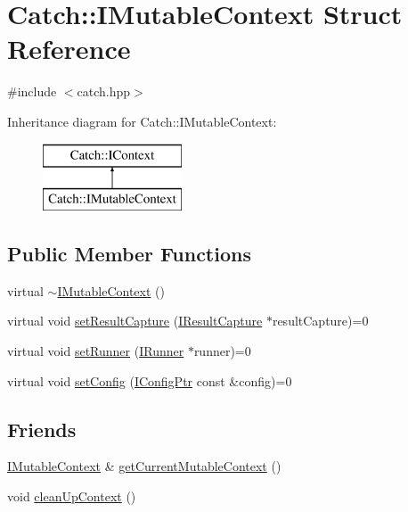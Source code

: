 \hypertarget{struct_catch_1_1_i_mutable_context}{}\section{Catch\+:\+:I\+Mutable\+Context Struct Reference}
\label{struct_catch_1_1_i_mutable_context}


{\ttfamily \#include $<$catch.\+hpp$>$}

Inheritance diagram for Catch\+:\+:I\+Mutable\+Context\+:\begin{figure}[H]
\begin{center}
\leavevmode
\includegraphics[height=2.000000cm]{struct_catch_1_1_i_mutable_context}
\end{center}
\end{figure}
\subsection*{Public Member Functions}
\begin{DoxyCompactItemize}
\item 
virtual \mbox{\hyperlink{struct_catch_1_1_i_mutable_context_a93f32b2ab6d0fb83637059240be799ab}{$\sim$\+I\+Mutable\+Context}} ()
\item 
virtual void \mbox{\hyperlink{struct_catch_1_1_i_mutable_context_a4a80afd0525b7def21bee8d9b48f2d39}{set\+Result\+Capture}} (\mbox{\hyperlink{struct_catch_1_1_i_result_capture}{I\+Result\+Capture}} $\ast$result\+Capture)=0
\item 
virtual void \mbox{\hyperlink{struct_catch_1_1_i_mutable_context_af2e53b1dea4527a2587cff266a730f6e}{set\+Runner}} (\mbox{\hyperlink{struct_catch_1_1_i_runner}{I\+Runner}} $\ast$runner)=0
\item 
virtual void \mbox{\hyperlink{struct_catch_1_1_i_mutable_context_aa81ba080fce084e9482f20338bc88531}{set\+Config}} (\mbox{\hyperlink{namespace_catch_afd20a5d4f9d2f4d525db81a7765367b0}{I\+Config\+Ptr}} const \&config)=0
\end{DoxyCompactItemize}
\subsection*{Friends}
\begin{DoxyCompactItemize}
\item 
\mbox{\hyperlink{struct_catch_1_1_i_mutable_context}{I\+Mutable\+Context}} \& \mbox{\hyperlink{struct_catch_1_1_i_mutable_context_aea4b25692aaf4397cdf630716976f6b8}{get\+Current\+Mutable\+Context}} ()
\item 
void \mbox{\hyperlink{struct_catch_1_1_i_mutable_context_ac07cdb7d744cc8f09672d924324b55fd}{clean\+Up\+Context}} ()
\end{DoxyCompactItemize}


